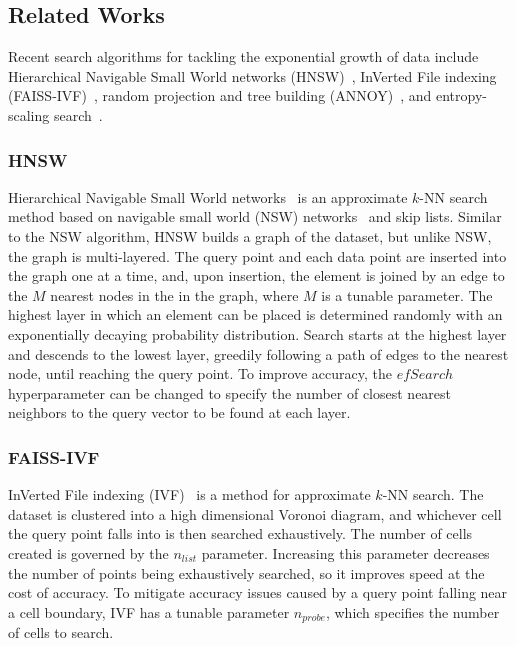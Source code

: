 \subsection{Related Works}
\label{sec:intoduction:related-works}

Recent search algorithms for tackling the exponential growth of data include Hierarchical Navigable Small World networks (HNSW)~\cite{Malkov2016EfficientAR}, InVerted File indexing (FAISS-IVF)~\cite{faissivf}, random projection and tree building (ANNOY)~\cite{annoy}, and entropy-scaling search~\cite{yu2015entropy, ishaq2019clustered}.


\subsubsection{HNSW}
\label{sec:introduction:related-works:hnsw}

Hierarchical Navigable Small World networks~\cite{Malkov2016EfficientAR} is an approximate $k$-NN search method based on navigable small world (NSW) networks~\cite{kleinberg2000navigation, boguna2009navigability} and skip lists. 
Similar to the NSW algorithm, HNSW builds a graph of the dataset, but unlike NSW, the graph is multi-layered.
The query point and each data point are inserted into the graph one at a time, and, upon insertion, the element is joined by an edge to the $M$ nearest nodes in the in the graph, where $M$ is a tunable parameter. 
The highest layer in which an element can be placed is determined randomly with an exponentially decaying probability distribution.
Search starts at the highest layer and descends to the lowest layer, greedily following a path of edges to the nearest node, until reaching the query point. 
To improve accuracy, the $efSearch$ hyperparameter can be changed to specify the number of closest nearest neighbors to the query vector to be found at each layer. 


\subsubsection{FAISS-IVF}
\label{sec:introduction:related-works:faiss-ivf}

InVerted File indexing (IVF)~\cite{faissivf, sacks1987multikey, kent1990signature} is a method for approximate $k$-NN search. 
The dataset is clustered into a high dimensional Voronoi diagram, and whichever cell the query point falls into is then searched exhaustively.
The number of cells created is governed by the $n_{list}$ parameter. 
Increasing this parameter decreases the number of points being exhaustively searched, so it improves speed at the cost of accuracy.
To mitigate accuracy issues caused by a query point falling near a cell boundary, IVF has a tunable parameter $n_{probe}$, which specifies the number of cells to search.


